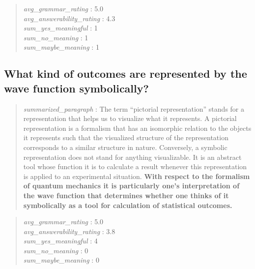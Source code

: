 \begin{quote}
\emph{avg\_grammar\_rating} : 5.0\\
\emph{avg\_answerability\_rating} : 4.3\\
\emph{sum\_yes\_meaningful} : 1\\
\emph{sum\_no\_meaning} : 1\\
\emph{sum\_maybe\_meaning} : 1
\end{quote}

\hypertarget{what-kind-of-outcomes-are-represented-by-the-wave-function-symbolically}{%
\subsection{What kind of outcomes are represented by the wave function
symbolically?}\label{what-kind-of-outcomes-are-represented-by-the-wave-function-symbolically}}

\begin{quote}
\emph{summarized\_paragraph} : The term ``pictorial representation''
stands for a representation that helps us to visualize what it
represents. A pictorial representation is a formalism that has an
isomorphic relation to the objects it represents such that the
visualized structure of the representation corresponds to a similar
structure in nature. Conversely, a symbolic representation does not
stand for anything visualizable. It is an abstract tool whose function
it is to calculate a result whenever this representation is applied to
an experimental situation. \textbf{With respect to the formalism of
quantum mechanics it is particularly one's interpretation of the wave
function that determines whether one thinks of it symbolically as a tool
for calculation of statistical outcomes.}
\end{quote}

\begin{quote}
\emph{avg\_grammar\_rating} : 5.0\\
\emph{avg\_answerability\_rating} : 3.8\\
\emph{sum\_yes\_meaningful} : 4\\
\emph{sum\_no\_meaning} : 0\\
\emph{sum\_maybe\_meaning} : 0
\end{quote}
